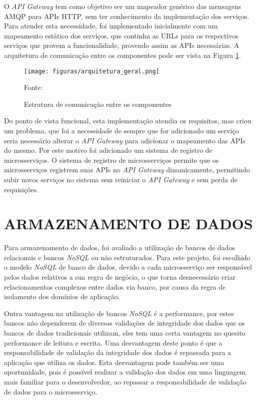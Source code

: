 O \emph{API Gateway} tem como objetivo ser um mapeador genérico das mensagens
\ac{AMQP} para \acp{API} \ac{HTTP}, sem ter conhecimento da implementação dos
serviços. Para atender esta necessidade, foi implementado inicialmente com um
mapeamento estático dos serviços, que continha as \acp{URL} para os respectivos
serviços que provem a funcionalidade, provendo assim as \acp{API} necessárias.
A arquitetura de comunicação entre os componentes pode ser vista na Figura
\ref{fig:arch-geral}.

\begin{figure}[H]
	\centering
	\caption{Estrutura de comunicação entre os componentes}
	\texttt{[image: figuras/arquitetura\_geral.png]}

    \label{fig:arch-geral}
	\footnotesize Fonte: \fonteOAutor
\end{figure}

Do ponto de vista funcional, esta implementação atendia os requisitos, mas
criou um problema, que foi a necessidade de sempre que for adicionado um
serviço seria necessário alterar o \emph{API Gateway} para adicionar o mapeamento
das \acp{API} do mesmo. Por este motivo foi adicionado um sistema de registro
de microsserviços. O sistema de registro de microsserviços permite que os
microsserviços registrem suas \acp{API} no \emph{API Gateway} dinamicamente,
permitindo subir novos serviços no sistema sem reiniciar o \emph{API Gateway}
e sem perda de requisições.

\section{ARMAZENAMENTO DE DADOS}

Para armazenamento de dados, foi avaliado a utilização de bancos de dados
relacionais e bancos \emph{NoSQL} ou não estruturados. Para este projeto, foi
escolhido o modelo \emph{NoSQL} de banco de dados, devido a cada microsserviço
ser responsável pelos dados relativos a sua regra de negócio, o que torna
desnecessário criar relacionamentos complexos entre dados via banco,
por causa da regra de isolamento dos domínios de aplicação.

Outra vantagem na utilização de bancos \emph{NoSQL} é a performance, por
estes bancos não dependerem de diversas validações de integridade dos dados
que os bancos de dados tradicionais utilizam, eles tem uma certa vantagem
no quesito performance de leitura e escrita. Uma desvantagem deste ponto é
que a responsabilidade de validação da integridade dos dados é repassada para
a aplicação que utiliza os dados. Esta desvantagem pode também ser uma
oportunidade, pois é possível realizar a validação dos dados em uma
linguagem mais familiar para o desenvolvedor, ao repassar a responsabilidade
de validação de dados para o microsserviço.

